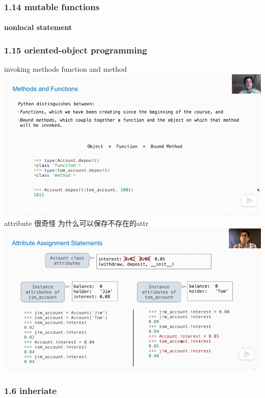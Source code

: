 \documentclass[11pt]{article}
\makeatletter
\def\maxwidth{\ifdim\Gin@nat@width>\linewidth\linewidth
    \else\Gin@nat@width\fi}
\let\Oldincludegraphics\includegraphics
\renewcommand{\includegraphics}[1]{\Oldincludegraphics[width=.8\maxwidth]{#1}}
\makeatother
\begin{document}
    \subsubsection{1.14 mutable functions}\label{mutable-functions}

\paragraph{nonlocal statement}\label{nonlocal-statement}

    \subsubsection{1.15 oriented-object
programming}\label{oriented-object-programming}

invoking methods function and method
\includegraphics{./image/functionandmethod.png} attribute 很奇怪
为什么可以保存不存在的attr \includegraphics{./image/attribute.png}

    \subsubsection{1.6 inheriate}\label{inheriate}
\end{document}

